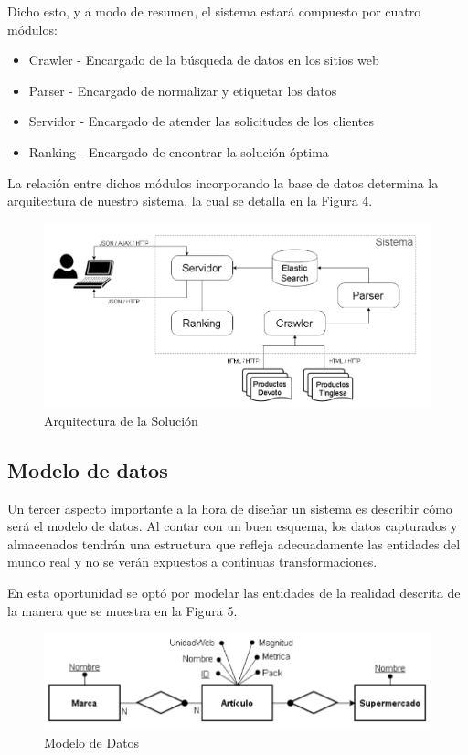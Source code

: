 \documentclass[12pt]{article} %
\begin{document}
Dicho esto, y a modo de resumen, el sistema estará compuesto por cuatro módulos:
\begin{itemize}
	\item Crawler     - Encargado de la búsqueda de datos en los sitios web
	\item Parser     - Encargado de normalizar y etiquetar los datos
	\item Servidor     - Encargado de atender las solicitudes de los clientes
	\item Ranking     - Encargado de encontrar la solución óptima 
\end{itemize}


La relación entre dichos módulos incorporando la base de datos determina la arquitectura de nuestro sistema, la cual se detalla en la Figura 4.

\begin{figure}[H]
\includegraphics[height=0.30\textwidth]{arquitectura}
\centering
\caption{Arquitectura de la Solución}
\end{figure}



\subsection{Modelo de datos}

Un tercer aspecto importante a la hora de diseñar un sistema es describir cómo será el modelo de datos. Al contar con un buen esquema, los datos capturados y almacenados tendrán una estructura que refleja adecuadamente las entidades del mundo real y no se verán expuestos a continuas transformaciones.

En esta oportunidad se optó por modelar las entidades de la realidad descrita de la manera que se muestra en la Figura 5.

\begin{figure}[H]
\includegraphics[height=0.20\textwidth]{modelo_de_datos}
\centering
\caption{Modelo de Datos}
\end{figure}
\end{document}
